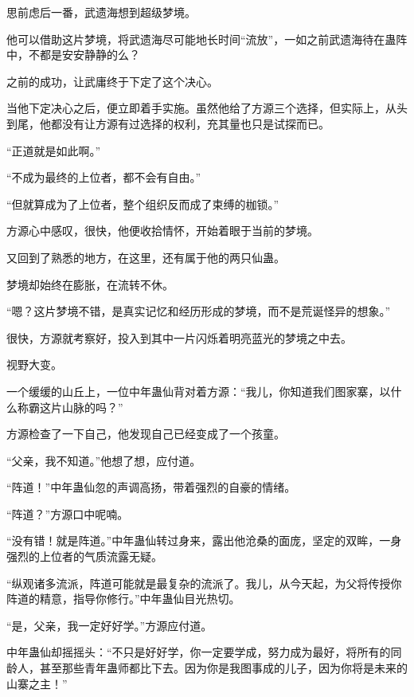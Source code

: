 \begin{this_body}
思前虑后一番，武遗海想到超级梦境。

他可以借助这片梦境，将武遗海尽可能地长时间“流放”，一如之前武遗海待在蛊阵中，不都是安安静静的么？

之前的成功，让武庸终于下定了这个决心。

当他下定决心之后，便立即着手实施。虽然他给了方源三个选择，但实际上，从头到尾，他都没有让方源有过选择的权利，充其量也只是试探而已。

“正道就是如此啊。”

“不成为最终的上位者，都不会有自由。”

“但就算成为了上位者，整个组织反而成了束缚的枷锁。”

方源心中感叹，很快，他便收拾情怀，开始着眼于当前的梦境。

又回到了熟悉的地方，在这里，还有属于他的两只仙蛊。

梦境却始终在膨胀，在流转不休。

“嗯？这片梦境不错，是真实记忆和经历形成的梦境，而不是荒诞怪异的想象。”

很快，方源就考察好，投入到其中一片闪烁着明亮蓝光的梦境之中去。

视野大变。

一个缓缓的山丘上，一位中年蛊仙背对着方源：“我儿，你知道我们图家寨，以什么称霸这片山脉的吗？”

方源检查了一下自己，他发现自己已经变成了一个孩童。

“父亲，我不知道。”他想了想，应付道。

“阵道！”中年蛊仙忽的声调高扬，带着强烈的自豪的情绪。

“阵道？”方源口中呢喃。

“没有错！就是阵道。”中年蛊仙转过身来，露出他沧桑的面庞，坚定的双眸，一身强烈的上位者的气质流露无疑。

“纵观诸多流派，阵道可能就是最复杂的流派了。我儿，从今天起，为父将传授你阵道的精意，指导你修行。”中年蛊仙目光热切。

“是，父亲，我一定好好学。”方源应付道。

中年蛊仙却摇摇头：“不只是好好学，你一定要学成，努力成为最好，将所有的同龄人，甚至那些青年蛊师都比下去。因为你是我图事成的儿子，因为你将是未来的山寨之主！”

\end{this_body}

